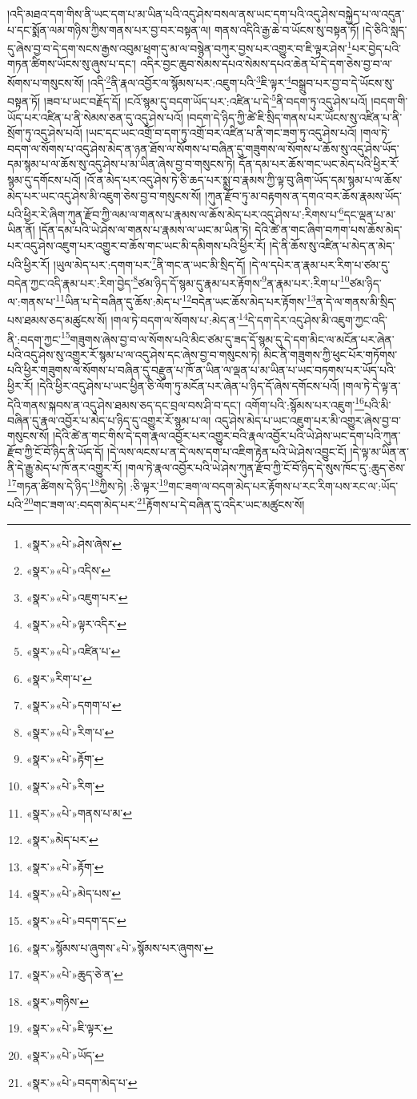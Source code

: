 །འདི་མཐའ་དག་གིས་ནི་ཡང་དག་པ་མ་ཡིན་པའི་འདུ་ཤེས་བསལ་ནས་ཡང་དག་པའི་འདུ་ཤེས་བསྐྱེད་པ་ལ་འདུན་པ་དང་སྨོན་ལམ་གཉིས་ཀྱིས་གནས་པར་བྱ་བར་བསྟན་ལ། གནས་འདིའི་རྒྱ་ཆེ་བ་ཡོངས་སུ་བསྟན་ཏོ། །དེ་ཅིའི་སླད་དུ་ཞེས་བྱ་བ་དེ་དག་སངས་རྒྱས་འབུམ་ཕྲག་དུ་མ་ལ་བསྙེན་བཀུར་བྱས་པར་འགྱུར་བ་ཇི་ལྟར་ཤེས་\footnote{«སྣར་»«པེ་»ཤེས་ཞེས་}པར་བྱེད་པའི་གཏན་ཚིགས་ཡོངས་སུ་ཞུས་པ་དང་། འདིར་བྱང་ཆུབ་སེམས་དཔའ་སེམས་དཔའ་ཆེན་པོ་དེ་དག་ཅེས་བྱ་བ་ལ་སོགས་པ་གསུངས་སོ། །འདི་\footnote{«སྣར་»«པེ་»འདིས་}ནི་རྣལ་འབྱོར་ལ་སྙོམས་པར་:འཇུག་པའི་\footnote{«སྣར་»«པེ་»འཇུག་པར་}ཇི་ལྟར་\footnote{«སྣར་»«པེ་»ལྟར་འདིར་}བསྒྲུབ་པར་བྱ་བ་དེ་ཡོངས་སུ་བསྟན་ཏོ། །ཟབ་པ་ཡང་བརྗོད་དོ། །ངའོ་སྙམ་དུ་བདག་ཡོད་པར་:འཛིན་པ་དེ་\footnote{«སྣར་»«པེ་»འཛིན་པ་}ནི་བདག་ཏུ་འདུ་ཤེས་པའོ། །བདག་གི་ཡོད་པར་འཛིན་པ་ནི་སེམས་ཅན་དུ་འདུ་ཤེས་པའོ། །བདག་དེ་ཉིད་ཀྱི་ཚེ་ཇི་སྲིད་གནས་པར་ཡོངས་སུ་འཛིན་པ་ནི་སྲོག་ཏུ་འདུ་ཤེས་པའོ། །ཡང་དང་ཡང་འགྲོ་བ་དག་ཏུ་འགྲོ་བར་འཛིན་པ་ནི་གང་ཟག་ཏུ་འདུ་ཤེས་པའོ། །གལ་ཏེ་བདག་ལ་སོགས་པ་འདུ་ཤེས་མེད་ན་ཉན་ཐོས་ལ་སོགས་པ་བཞིན་དུ་གཟུགས་ལ་སོགས་པ་ཆོས་སུ་འདུ་ཤེས་ཡོད་དམ་སྙམ་པ་ལ་ཆོས་སུ་འདུ་ཤེས་པ་མ་ཡིན་ཞེས་བྱ་བ་གསུངས་ཏེ། དོན་དམ་པར་ཆོས་གང་ཡང་མེད་པའི་ཕྱིར་རོ་སྙམ་དུ་དགོངས་པའོ། །འོ་ན་མེད་པར་འདུ་ཤེས་ཏེ་ཅི་ཆད་པར་སྨྲ་བ་རྣམས་ཀྱི་ལྟ་བུ་ཞིག་ཡོད་དམ་སྙམ་པ་ལ་ཆོས་མེད་པར་ཡང་འདུ་ཤེས་མི་འཇུག་ཅེས་བྱ་བ་གསུངས་སོ། །ཀུན་རྫོབ་ཏུ་མ་བརྟགས་ན་དགའ་བར་ཆོས་རྣམས་ཡོད་པའི་ཕྱིར་རེ་ཞིག་ཀུན་རྫོབ་ཀྱི་ལམ་ལ་གནས་པ་རྣམས་ལ་ཆོས་མེད་པར་འདུ་ཤེས་པ་:རིགས་པ་\footnote{«སྣར་»རིག་པ་}དང་ལྡན་པ་མ་ཡིན་ནོ། །དོན་དམ་པའི་ཡེ་ཤེས་ལ་གནས་པ་རྣམས་ལ་ཡང་མ་ཡིན་ཏེ། དེའི་ཚེ་ན་གང་ཞིག་བཀག་པས་ཆོས་མེད་པར་འདུ་ཤེས་འཇུག་པར་འགྱུར་བ་ཆོས་གང་ཡང་མི་དམིགས་པའི་ཕྱིར་རོ། །དེ་ནི་ཆོས་སུ་འཛིན་པ་མེད་ན་མེད་པའི་ཕྱིར་རོ། །ཡུལ་མེད་པར་:དགག་པར་\footnote{«སྣར་»«པེ་»དགག་པ་}ནི་གང་ན་ཡང་མི་སྲིད་དོ། །དེ་ལ་དཔེར་ན་རྣམ་པར་རིག་པ་ཙམ་དུ་བདེན་ཀྱང་འདི་རྣམ་པར་:རིག་བྱེད་\footnote{«སྣར་»«པེ་»རིག་པ་}ཙམ་ཉིད་དོ་སྙམ་དུ་རྣམ་པར་རྟོགས་\footnote{«སྣར་»«པེ་»རྟོག་}ན་རྣམ་པར་:རིག་པ་\footnote{«སྣར་»«པེ་»རིག་}ཙམ་ཉིད་ལ་:གནས་པ་\footnote{«སྣར་»«པེ་»གནས་པ་མ་}ཡིན་པ་དེ་བཞིན་དུ་ཆོས་:མེད་པ་\footnote{«སྣར་»མེད་པར་}བདེན་ཡང་ཆོས་མེད་པར་རྟོགས་\footnote{«སྣར་»«པེ་»རྟོག་}ན་དེ་ལ་གནས་མི་སྲིད་པས་ཐམས་ཅད་མཚུངས་སོ། །གལ་ཏེ་བདག་ལ་སོགས་པ་:མེད་ན་\footnote{«སྣར་»«པེ་»མེད་པས་}དེ་དག་དེར་འདུ་ཤེས་མི་འཇུག་ཀྱང་འདི་ནི་:བདག་ཀྱང་\footnote{«སྣར་»«པེ་»བདག་དང་}གཟུགས་ཞེས་བྱ་བ་ལ་སོགས་པའི་མིང་ཙམ་དུ་ཟད་དོ་སྙམ་དུ་དེ་དག་མིང་ལ་མངོན་པར་ཞེན་པའི་འདུ་ཤེས་སུ་འགྱུར་རོ་སྙམ་པ་ལ་འདུ་ཤེས་དང་ཞེས་བྱ་བ་གསུངས་ཏེ། མིང་ནི་གཟུགས་ཀྱི་ཕུང་པོར་གཏོགས་པའི་ཕྱིར་གཟུགས་ལ་སོགས་པ་བཞིན་དུ་བརྫུན་པ་ཁོ་ན་ཡིན་ལ་ལྡན་པ་མ་ཡིན་པ་ཡང་བཏགས་པར་ཡོད་པའི་ཕྱིར་རོ། །དེའི་ཕྱིར་འདུ་ཤེས་པ་ཡང་ཕྱིན་ཅི་ལོག་ཏུ་མངོན་པར་ཞེན་པ་ཉིད་དོ་ཞེས་དགོངས་པའོ། །གལ་ཏེ་དེ་ལྟ་ན་དེའི་གནས་སྐབས་ན་འདུ་ཤེས་ཐམས་ཅད་དང་བྲལ་བས་ཤི་བ་དང་། འགོག་པའི་:སྙོམས་པར་འཇུག་\footnote{«སྣར་»སྙོམས་པ་ཞུགས་«པེ་»སྙོམས་པར་ཞུགས་}པའི་མི་བཞིན་དུ་རྣལ་འབྱོར་པ་མེད་པ་ཉིད་དུ་འགྱུར་རོ་སྙམ་པ་ལ། འདུ་ཤེས་མེད་པ་ཡང་འཇུག་པར་མི་འགྱུར་ཞེས་བྱ་བ་གསུངས་སོ། །དེའི་ཚེ་ན་གང་གིས་དེ་དག་རྣལ་འབྱོར་པར་འགྱུར་བའི་རྣལ་འབྱོར་པའི་ཡེ་ཤེས་ཡང་དག་པའི་ཀུན་རྫོབ་ཀྱི་ངོ་བོ་ཉིད་ནི་ཡོད་དོ། །དེ་ལས་ལངས་པ་ན་དེ་ལས་དག་པ་འཇིག་རྟེན་པའི་ཡེ་ཤེས་འབྱུང་ངོ། །དེ་ལྟ་མ་ཡིན་ན་ནི་དེ་རྒྱུ་མེད་པ་ཁོ་ནར་འགྱུར་རོ། །གལ་ཏེ་རྣལ་འབྱོར་པའི་ཡེ་ཤེས་ཀུན་རྫོབ་ཀྱི་ངོ་བོ་ཉིད་དེ་སུས་ཁོང་དུ་:ཆུད་ཅེས་\footnote{«སྣར་»«པེ་»ཆུད་ཅེ་ན་}གཏན་ཚིགས་དེ་ཉིད་\footnote{«སྣར་»གཉིས་}ཀྱིས་ཏེ། :ཅི་ལྟར་\footnote{«སྣར་»«པེ་»ཇི་ལྟར་}གང་ཟག་ལ་བདག་མེད་པར་རྟོགས་པ་རང་རིག་པས་རང་ལ་:ཡོད་པའི་\footnote{«སྣར་»«པེ་»ཡོད་}གང་ཟག་ལ་:བདག་མེད་པར་\footnote{«སྣར་»«པེ་»བདག་མེད་པ་}རྟོགས་པ་དེ་བཞིན་དུ་འདིར་ཡང་མཚུངས་སོ། 